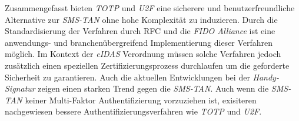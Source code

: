 \documentclass[11pt,a4paper,ngerman]{scrreprt}
\begin{document}
Zusammengefasst bieten \textit{TOTP} und \textit{U2F} eine sicherere und benutzerfreundliche Alternative zur \textit{SMS-TAN} ohne hohe Komplexität zu induzieren. Durch die Standardisierung der Verfahren durch RFC und die \textit{FIDO Alliance} ist eine anwendungs- und branchenübergreifend Implementierung dieser Verfahren möglich. Im Kontext der \textit{eIDAS} Verordnung müssen solche Verfahren jedoch zusätzlich einen speziellen Zertifizierungsprozess durchlaufen um die geforderte Sicherheit zu garantieren. Auch die aktuellen Entwicklungen bei der \textit{Handy-Signatur} zeigen einen starken Trend gegen die \textit{SMS-TAN}. Auch wenn die \textit{SMS-TAN} keiner Multi-Faktor Authentifizierung vorzuziehen ist, exisiteren nachgewiesen bessere Authentifizierungsverfahren wie \textit{TOTP} und \textit{U2F}.



\end{document}
